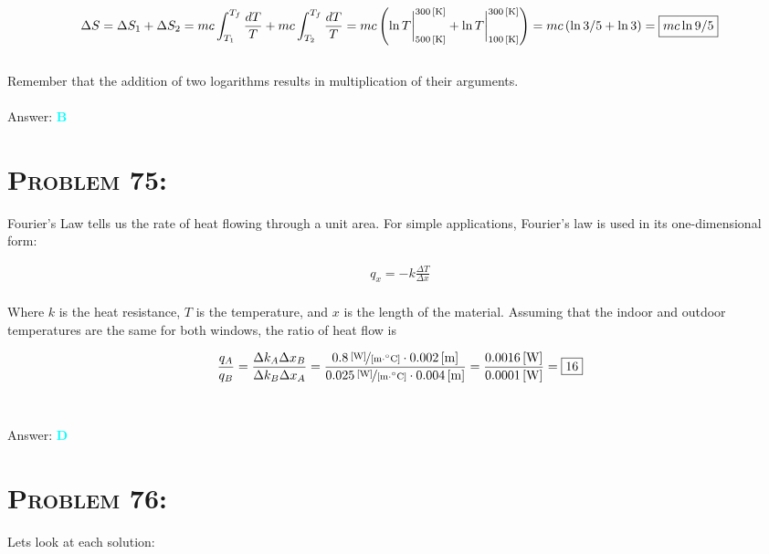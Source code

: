 \documentclass{article}
\begin{document}
\begin{align}
\Delta S = \Delta S_{1} + \Delta S_{2} = mc \int_{T_{1}}^{T_{f}}{\frac{dT}{T}} + mc \int_{T_{2}}^{T_{f}}{\frac{dT}{T}} = mc \left(  \ln{T} \biggr\rvert_{\unit[500]{[K]}}^{\unit[300]{[K]}} + \ln{T} \biggr\rvert_{\unit[100]{[K]}}^{\unit[300]{[K]}}  \right)  = mc \left(  \ln{3/5} +\ln{3}    \right) = \boxed{mc \ln{9/5} }\nonumber
\end{align}
\\
Remember that the addition of two logarithms results in multiplication of their arguments.
\\\\
Answer: \textbf{\textcolor{cyan}B}\\


\section{\textsc{Problem 75:}} Fourier's Law tells us the rate of heat flowing through a unit area. For simple applications, Fourier's law is used in its one-dimensional form:

\begin{gather}
q_{x} = -k \frac{\Delta T}{\Delta x}
\end{gather}
\\
Where $k$ is the heat resistance, $ T$ is the temperature, and $x$ is the length of the material. Assuming that the indoor and outdoor temperatures are the same for both windows, the ratio of heat flow is

\begin{gather}
\frac{q_{A}}{q_{B}} = \frac{\Delta k_{A} \Delta x_{B}}{\Delta k_{B} \Delta x_{A}} = \frac  { \unitfrac[0.8]{[W]} {[m \cdot ^{\circ}C]}  \cdot \unit[0.002]{[m]}}   { \unitfrac[0.025]{[W]} {[m \cdot ^{\circ}C]}  \cdot \unit[0.004]{[m]}} = \frac{ \unit[0.0016]{[W]}} {\unit[0.0001]{[W]}} = \boxed{16} \nonumber
\end{gather}
\\\\
Answer: \textbf{\textcolor{cyan}D}\\


\section{\textsc{Problem 76:}} Lets look at each solution:
\end{document}
